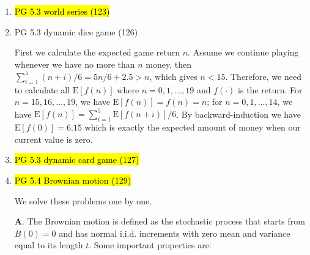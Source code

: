 \documentclass[10pt]{article}
\newcommand{\E}{\text{E}}
\newenvironment{note}{\begin{enumerate}[leftmargin=1em,topsep=0pt,noitemsep]}{\end{enumerate}}
\newcommand{\solution}{\boxed{\textbf{SOLUTION}}\hspace{.5em}}
\begin{document}
\begin{spacing}{1.1}
\begin{note}
      \solution In the third throw we have $1/6$ probability for each result $x$, which leads to the expected value $\E[V_3]=3.5$, while we're not necessarily optimal to choose to throw the third time. Actually, our possible values for the second throw are
      $$
      V_2 = \begin{cases}
      3.5 & \text{if we get $1,2,3$},\\
      4 & \text{if we get $4$},\\
      5 & \text{if we get $5$},\\
      6 & \text{if we get $6$}\\
      \end{cases}
      $$
      and each has probability $1/6$, so $\E[V_2]=4.25$. Further, conditional on the first throw, we can actually have better choices, namely
      $$
      V_1 = \begin{cases}
      4.25 & \text{if we get $1,2,3,4$},\\
      5 & \text{if we get $5$},\\
      6 & \text{if we get $6$}\\
      \end{cases}
      $$
      and thus $\E[V_1]=14/3$.

\item \hl{PG 5.3 world series (123)}

\item PG 5.3 dynamic dice game (126)
      
      \solution First we calculate the expected game return $n$. Assume we continue playing whenever we have no more than $n$ money, then $\sum_{i=1}^5 (n+i)/6 = 5n/6 + 2.5 > n$, which gives $n < 15$. Therefore, we need to calculate all $\E[f(n)]$ where $n=0,1,\ldots,19$ and $f(\cdot)$ is the return. For $n=15,16,\ldots,19$, we have $\E[f(n)]=f(n)=n$; for $n=0,1,\ldots,14$, we have $\E[f(n)]=\sum_{i=1}^5 \E[f(n+i)]/6$. By backward-induction we have $\E[f(0)]=6.15$ which is exactly the expected amount of money when our current value is zero.

\item \hl{PG 5.3 dynamic card game (127)}

\item \hl{PG 5.4 Brownian motion (129)}

      \solution We solve these problems one by one. 

      \textbf{A}. The Brownian motion is defined as the stochastic process that starts from $B(0)=0$ and has normal i.i.d. increments with zero mean and variance equal to its length $t$. Some important properties are:


\end{note}
\end{spacing}
\end{document}
